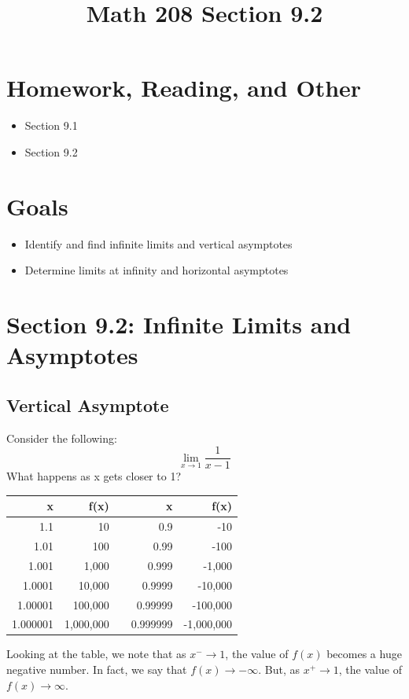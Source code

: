 \documentclass[14pt]{extarticle}
\title{\vspace{-5ex}Math 208 Section 9.2}
\date{\vspace{-10ex}}
\begin{document}
	\maketitle		
	\section*{Homework, Reading, and Other}
	\begin{itemize}
		\item Section 9.1
		\item Section 9.2
	\end{itemize}

	\section{Goals}
	\begin{itemize}
		\item Identify and find infinite limits and vertical asymptotes
		\item Determine limits at infinity and horizontal asymptotes
	\end{itemize}
		
\section{Section 9.2: Infinite Limits and Asymptotes}
\subsection{Vertical Asymptote}
Consider the following:
$$\lim_{x\to 1}\frac{1}{x-1}$$
What happens as x gets closer to 1?

\begin{center}
\begin{tabular}{|r|r|c|r|r|}
	\hline
	x & f(x) & \hspace{2cm} & x & f(x) \\
	\hline\hline
	1.1 & 10 &  & 0.9 & -10 \\
	\hline
	1.01 & 100 &  & 0.99 & -100 \\
	\hline
	1.001 & 1,000 &  & 0.999 & -1,000 \\
	\hline
	1.0001 & 10,000 &  & 0.9999 & -10,000 \\
	\hline
	1.00001 & 100,000 &  & 0.99999 & -100,000 \\
	\hline
	1.000001 & 1,000,000 &  & 0.999999 & -1,000,000 \\
	\hline
\end{tabular}
\end{center}
Looking at the table, we note that as $x^-\to 1$, the value of $f(x)$ becomes a huge negative number. In fact, we say that $f(x)\to -\infty$. But, as $x^+\to 1$, the value of $f(x)\to \infty$.
\end{document}
